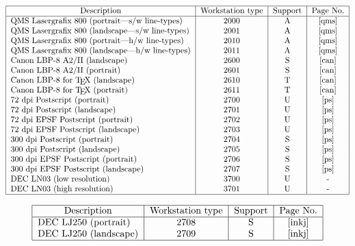 \begin{table}\caption{Laser Printers}
\[\begin{tabular}{|l|c|c|c|}\hline
\multicolumn{1}{|c|}{Description} &Workstation type &Support &Page No.\\\hline
QMS Lasergrafix 800 (portrait---s/w line-types)  &2000 &A
&\pageref{qms}\\
QMS Lasergrafix 800 (landscape---s/w line-types) &2001 &A
&\pageref{qms}\\
QMS Lasergrafix 800 (portrait---h/w line-types)  &2010 &A
&\pageref{qms}\\
QMS Lasergrafix 800 (landscape---h/w line-types) &2011 &A
&\pageref{qms}\\
Canon LBP-8 A2/II (landscape)                &2600 &S &\pageref{can}\\
Canon LBP-8 A2/II (portrait)                 &2601 &S &\pageref{can}\\
Canon LBP-8 for \TeX\ (landscape)            &2610 &T &\pageref{can}\\
Canon LBP-8 for \TeX\ (portrait)             &2611 &T &\pageref{can}\\
72 dpi Postscript (portrait)                 &2700 &U &\pageref{ps}\\
72 dpi Postscript (landscape)                &2701 &U &\pageref{ps}\\
72 dpi EPSF Postscript (portrait)            &2702 &U &\pageref{ps}\\
72 dpi EPSF Postscript (landscape)           &2703 &U &\pageref{ps}\\
300 dpi Postscript (portrait)                &2704 &S &\pageref{ps}\\
300 dpi Postscript (landscape)               &2705 &S &\pageref{ps}\\
300 dpi EPSF Postscript (portrait)           &2706 &S &\pageref{ps}\\
300 dpi EPSF Postscript (landscape)          &2707 &S &\pageref{ps}\\
DEC LN03 (low resolution)                    &3700 &U &-\\
DEC LN03 (high resolution)                   &3701 &U &-\\
\hline\end{tabular}\]\end{table}

\begin{table}\caption{Ink Jet Printers}
\[\begin{tabular}{|l|c|c|c|}\hline
\multicolumn{1}{|c|}{Description} &Workstation type &Support &Page No.\\\hline
DEC LJ250 (portrait)                &2708 &S &\pageref{inkj}\\
DEC LJ250 (landscape)               &2709 &S &\pageref{inkj}\\
\hline\end{tabular}\]\end{table}

